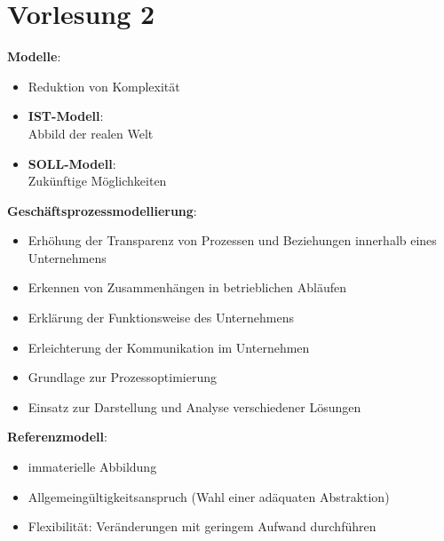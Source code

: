 \documentclass[a4]{scrartcl}
\begin{document}
\section*{Vorlesung 2}

\textbf{Modelle}:
\begin{itemize}
    \item Reduktion von Komplexität
    \item \textbf{IST-Modell}: \\
    Abbild der realen Welt
    \item \textbf{SOLL-Modell}: \\
    Zukünftige Möglichkeiten
\end{itemize}

\textbf{Geschäftsprozessmodellierung}:
\begin{itemize}
    \item Erhöhung der Transparenz von Prozessen und Beziehungen innerhalb eines Unternehmens
    \item Erkennen von Zusammenhängen in betrieblichen Abläufen
    \item Erklärung der Funktionsweise des Unternehmens
    \item Erleichterung der Kommunikation im Unternehmen
    \item Grundlage zur Prozessoptimierung
    \item Einsatz zur Darstellung und Analyse verschiedener Lösungen
\end{itemize}


\textbf{Referenzmodell}:
\begin{itemize}
    \item immaterielle Abbildung
    \item Allgemeingültigkeitsanspruch (Wahl einer adäquaten Abstraktion)
    \item Flexibilität: Veränderungen mit geringem Aufwand durchführen
\end{itemize}
 \ \\
 
\end{document}
